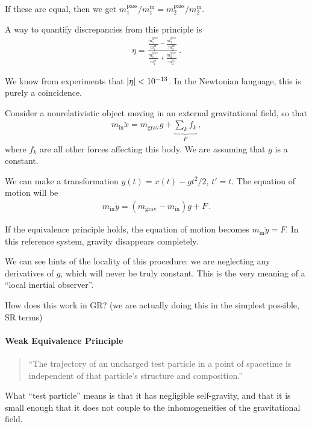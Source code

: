 \documentclass[main.tex]{subfiles}
\begin{document}
If these are equal, then we get \(m_1^{\text{pass}} / m_1^{\text{in}} = m_2^{\text{pass}} / m_2^{\text{in}}\).

A way to quantify discrepancies from this principle is 
%
\begin{align}
\eta = \frac{\frac{m_1^{\text{grav}}}{m_1^{\text{in}}} - \frac{m_2^{\text{grav}}}{m_2^{\text{in}}}}{\frac{m_1^{\text{grav}}}{m_1^{\text{in}}} + \frac{m_2^{\text{grav}}}{m_2^{\text{in}}}}
\,.
\end{align}

We know from experiments that \(\abs{\eta } < \num{e-13}\). 
In the Newtonian language, this is purely a coincidence. 

Consider a nonrelativistic object moving in an external gravitational field, so that 
%
\begin{align}
m _{\text{in}} \ddot{x} = m _{\text{grav}} g + \underbrace{\sum _{k}f_k}_{F}
\,,
\end{align}
%
where \(f_k\) are all other forces affecting this body. 
We are assuming that \(g\) is a constant.

We can make a transformation \(y(t) = x(t) - g t^2 / 2\), \(t' = t\). 
The equation of motion will be 
%
\begin{align}
m _{\text{in}} \ddot{y} = (m _{\text{grav}} - m _{\text{in}} ) g + F
\,.
\end{align}

If the equivalence principle holds, the equation of motion becomes \(m _{\text{in}} \ddot{y} = F\). 
In this reference system, gravity disappears completely. 

We can see hints of the locality of this procedure: we are neglecting any derivatives of \(g\), which will never be truly constant. 
This is the very meaning of a ``local inertial observer''. 

How does this work in GR? 
(we are actually doing this in the simplest possible, SR terms)

\paragraph{Weak Equivalence Principle}

\begin{quotation}
``The trajectory of an uncharged test particle in a point of spacetime is independent of that particle's structure and composition.''
\end{quotation}

What ``test particle'' means is that it has negligible self-gravity, and that it is small enough that it does not couple to the inhomogeneities of the gravitational field. 
\end{document}
